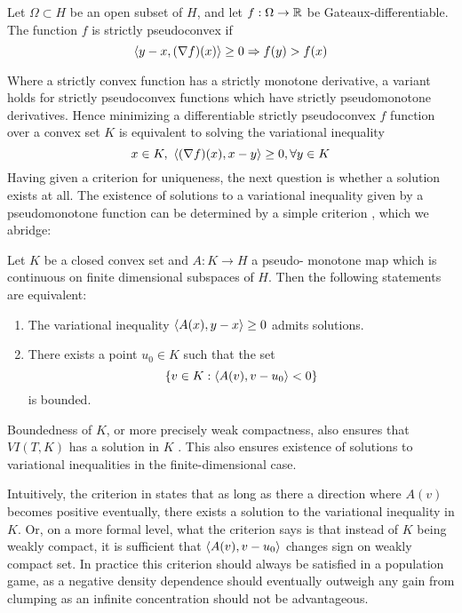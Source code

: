 \begin{definition}
  Let $\Omega \subset H$ be an open subset of $H$, and let $f:\Omega \to \mathbb{R}$ be Gateaux-differentiable. The function $f$ is strictly pseudoconvex if
  \begin{equation}
    \left \langle y-x,(\nabla f)(x) \right \rangle \geq 0 \Rightarrow f(y) > f(x)
  \end{equation}
\end{definition}
Where a strictly convex function has a strictly monotone derivative, a variant holds for strictly pseudoconvex functions which have strictly pseudomonotone derivatives.
Hence minimizing a differentiable strictly pseudoconvex $f$ function over a convex set $K$ is equivalent to solving the variational inequality \citep[P. 521]{hadjisavvas2006handbook}
\begin{equation}
  \label{eq:min_func}
  x \in K, ~ \left \langle (\nabla f)(x),x-y \right \rangle \geq 0, \forall y\in K
\end{equation}
Having given a criterion for uniqueness, the next question is whether a solution exists at all. The existence of solutions to a variational inequality given by a pseudomonotone function can be determined by a simple criterion \citep[Theorem 3.4]{maugeri2009existence}, which we abridge:
\begin{theorem}
  \label{thm:existence}
  Let $K$ be a closed convex set and $A : K \to H$  a pseudo-
  monotone map which is continuous on finite dimensional subspaces of $H$. Then the following statements are equivalent:
\end{theorem}
\begin{enumerate}
  \item The variational inequality $\left \langle A(x),y-x \right \rangle \geq 0$ admits solutions.
  \item There exists a point $u_0 \in K$ such that the set
  \begin{equation}
    \{v \in K : \left \langle A(v),v-u_0 \right \rangle < 0\}
  \end{equation}
  is bounded.
\end{enumerate}
\begin{remark}
  \label{rem:weak_compact}
  Boundedness of $K$, or more precisely weak compactness, also ensures that $VI(T,K)$ has a solution in $K$ \citep[Theorem 12.1, P. 510]{hadjisavvas2006handbook}. This also ensures existence of solutions to variational inequalities in the finite-dimensional case.
\end{remark}
Intuitively, the criterion in  states that as long as there a direction where $A(v)$ becomes positive eventually, there exists a solution to the variational inequality in $K$. Or, on a more formal level, what the criterion says is that instead of $K$ being weakly compact, it is sufficient that $\left \langle A(v),v-u_0 \right \rangle$ changes sign on weakly compact set. In practice this criterion should always be satisfied in a population game, as a negative density dependence should eventually outweigh any gain from clumping as an infinite concentration should not be advantageous.


